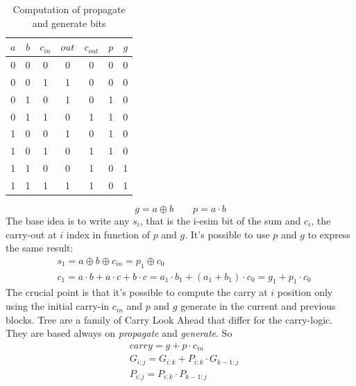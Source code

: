 \begin{itemize}
    \begin{table}[H]
        \begin{center}
            \begin{tabular}{ c c c | c c | c c}
                $a$ & $b$ & $c_{in}$ & $out$ & $c_{out}$ & $p$ & $g$ \\
                \hline
                0 & 0 & 0 & 0 & 0 & 0 & 0\\ 
                0 & 0 & 1 & 1 & 0 & 0 & 0\\ 
                0 & 1 & 0 & 1 & 0 & 1 & 0\\ 
                0 & 1 & 1 & 0 & 1 & 1 & 0\\ 
                1 & 0 & 0 & 1 & 0 & 1 & 0\\ 
                1 & 0 & 1 & 0 & 1 & 1 & 0\\ 
                1 & 1 & 0 & 0 & 1 & 0 & 1\\ 
                1 & 1 & 1 & 1 & 1 & 0 & 1\\ 
            \end{tabular}
            \caption{Computation of propagate and generate bits}
        \end{center}
    \end{table}
    \begin{equation} \label{eq:pandg}
        g = a \oplus b \quad\quad p = a \cdot b
    \end{equation}
    The base idea is to write any $s_i$, that is the i-esim bit of the sum and $c_i$, the carry-out at $i$ index in function of $p$ and $g$.
    It's possible to use $p$ and $g$ to express the same result:
    \begin{align*}
        & s_1 = a \oplus b \oplus c_{in} = p_1 \oplus c_0\\
        & c_1 = a \cdot b + a \cdot c + b \cdot c = a_1 \cdot b_1 + (a_1 + b_1) \cdot c_0 =  g_1 + p_1 \cdot c_0
    \end{align*}
    The crucial point is that it's possible to compute the carry at $i$ position only using the initial carry-in $c_{in}$ and $p$ and $g$ generate in the current and previous blocks. Tree are a family of Carry Look Ahead that differ for the carry-logic. They are based always on \textit{propagate} and \textit{generate}. So  
    \begin{align*}
        & carry = g + p \cdot c_{in}\\
        & G_{i:j} = G_{i:k} + P_{i:k} \cdot G_{k-1:j}\\
        & P_{i:j} = P_{i:k} \cdot P_{k-1:j}
    \end{align*}

\end{itemize}
